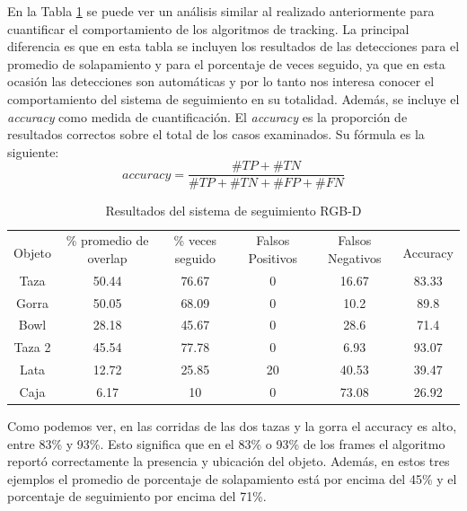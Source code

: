 En la Tabla \ref{tabla_sistema_rgbd} se puede ver un análisis similar al realizado anteriormente para cuantificar el comportamiento de los algoritmos de tracking. La principal diferencia es que en esta tabla se incluyen los resultados de las detecciones para el promedio de solapamiento y para el porcentaje de veces seguido, ya que en esta ocasión las detecciones son automáticas y por lo tanto nos interesa conocer el comportamiento del sistema de seguimiento en su totalidad. Además, se incluye el \textit{accuracy} como medida de cuantificación. El \textit{accuracy} es la proporción de resultados correctos sobre el total de los casos examinados. Su fórmula es la siguiente:
\begin{equation}
accuracy = \frac{\#TP + \#TN}{\#TP + \#TN + \#FP + \#FN}
\end{equation}

\begin{table}[h]
	\centering
    \begin{tabular}{|c|c|c|c|c|c|}
    \hline
    & \multirow{2}{2.4cm}{\% promedio de overlap} & \multirow{2}{2cm}{\% veces seguido} & \multirow{2}{1.6cm}{Falsos Positivos} & \multirow{2}{1.6cm}{Falsos Negativos} &\\
	Objeto & & & & & Accuracy\\
	\hline
    Taza    & 50.44      & 76.67     &    0           & 16.67    & 83.33 \\
    \hline
    Gorra   & 50.05      & 68.09     &    0           &  10.2    & 89.8 \\
    \hline
    Bowl    & 28.18      & 45.67     &    0           &  28.6    & 71.4 \\
    \hline
    Taza 2  & 45.54      & 77.78     &    0           &  6.93    & 93.07 \\
    \hline
    Lata    & 12.72      & 25.85     &   20           & 40.53    & 39.47 \\
    \hline
    Caja    &  6.17      &    10     &    0           & 73.08    & 26.92 \\
    \hline
    \end{tabular}
\caption{Resultados del sistema de seguimiento RGB-D}
\label{tabla_sistema_rgbd}
\end{table}


Como podemos ver, en las corridas de las dos tazas y la gorra el accuracy es alto, entre 83\% y 93\%. Esto significa que en el 83\% o 93\% de los frames el algoritmo reportó correctamente la presencia y ubicación del objeto. Además, en estos tres ejemplos el promedio de porcentaje de solapamiento está por encima del 45\% y el porcentaje de seguimiento por encima del 71\%.


